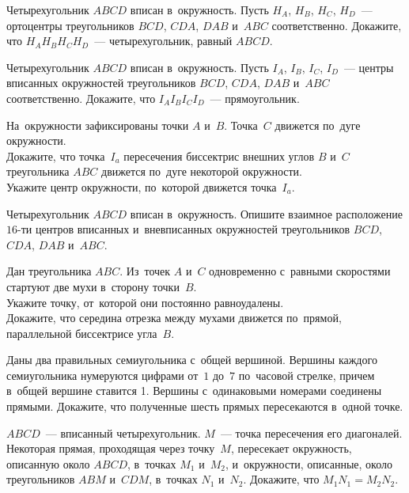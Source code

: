 


\begin{problems}

\item
Четырехугольник $ABCD$ вписан в~окружность.
Пусть $H_A$, $H_B$, $H_C$, $H_D$~--- ортоцентры треугольников
$BCD$, $CDA$, $DAB$ и~$ABC$ соответственно.
Докажите, что $H_A H_B H_C H_D$~--- четырехугольник, равный $ABCD$.

\item
Четырехугольник $ABCD$ вписан в~окружность.
Пусть $I_A$, $I_B$, $I_C$, $I_D$~--- центры вписанных окружностей
треугольников $BCD$, $CDA$, $DAB$ и~$ABC$ соответственно.
Докажите, что $I_A I_B I_C I_D$~--- прямоугольник.

\item
На~окружности зафиксированы точки $A$ и~$B$.
Точка~$C$ движется по~дуге окружности.
\\
\subproblem
Докажите, что точка~$I_a$ пересечения биссектрис внешних углов $B$ и~$C$
треугольника $ABC$ движется по~дуге некоторой окружности.
\\
\subproblem
Укажите центр окружности, по~которой движется точка~$I_a$.

\item
Четырехугольник $ABCD$ вписан в~окружность.
Опишите взаимное расположение $16$-ти центров вписанных и~вневписанных
окружностей треугольников $BCD$, $CDA$, $DAB$ и~$ABC$.

\item
Дан треугольника $ABC$.
Из~точек $A$ и~$C$ одновременно с~равными скоростями стартуют две мухи
в~сторону точки~$B$.
\\
\subproblem
Укажите точку, от~которой они постоянно равноудалены.
\\
\subproblem
Докажите, что середина отрезка между мухами движется по~прямой, параллельной
биссектрисе угла~$B$.

\item
Даны два правильных семиугольника с~общей вершиной.
Вершины каждого семиугольника нумеруются цифрами от~$1$ до~$7$ по~часовой
стрелке, причем в~общей вершине ставится 1.
Вершины с~одинаковыми номерами соединены прямыми.
Докажите, что полученные шесть прямых пересекаются в~одной точке.

\item
$ABCD$~--- вписанный четырехугольник.
$M$~--- точка пересечения его диагоналей.
Некоторая прямая, проходящая через точку~$M$, пересекает окружность, описанную
около $ABCD$, в~точках $M_1$ и~$M_2$, и~окружности, описанные, около
треугольников $ABM$ и~$CDM$, в~точках $N_1$ и~$N_2$.
Докажите, что $M_1 N_1 = M_2 N_2$.

\end{problems}

